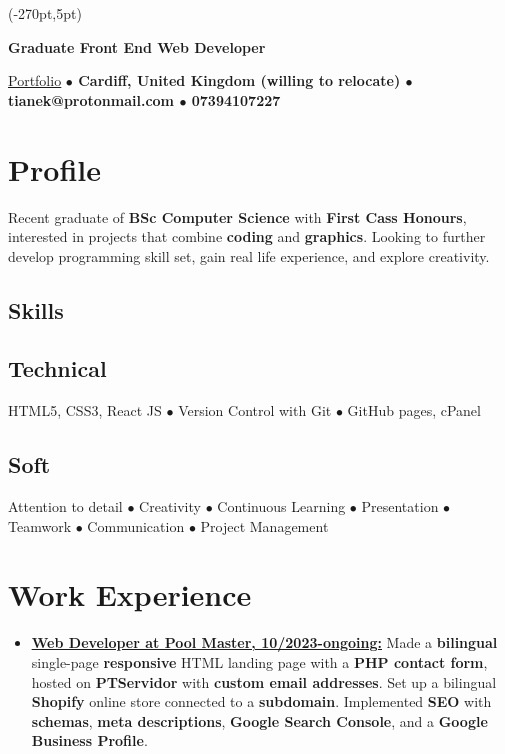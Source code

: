 \documentclass[11pt]{article}
\makeatletter
\newcommand{\verticalline}[1][1pt]{\rule[-0.35ex]{#1}{0.9em}}
\renewcommand{\maketitle}{
\begin{center}
    {\huge\bfseries
    \theauthor \hspace{0.5em}{\verticalline[1.5pt]}\hspace{0.5em}Graduate Front End Web Developer} 

    \vspace{0.7em}

    \ulink{https://orbit-9j.github.io/Portfolio/}{Portfolio} 
    \textbf{$\bullet$  Cardiff, United Kingdom (willing to relocate) $\bullet$ tianek@protonmail.com  $\bullet$ 07394107227}
\end{center}
}
\newcommand{\ulink}[2]{\href{#1}{\uline{#2}}}
\makeatother
\begin{document}
\begin{textblock*}{\paperwidth}(-270pt,5pt)
    \hspace*{\fill}
\end{textblock*}
\vspace*{-0.8cm}
    \author{Rin Tian}
    \maketitle

    \section{Profile}
    Recent graduate of \textbf{BSc Computer Science} with \textbf{First Cass Honours}, interested in projects that combine \textbf{coding} and \textbf{graphics}. Looking to further develop programming skill set, gain real life experience, and explore creativity. 

    \begin{center}
        \section{Skills} 
        \subsection{Technical}
    HTML5, CSS3, React JS $\bullet$ Version Control with Git $\bullet$ GitHub pages, cPanel 
        
        \subsection{Soft}Attention to detail $\bullet$ Creativity $\bullet$ Continuous Learning $\bullet$
        Presentation $\bullet$ Teamwork $\bullet$ Communication $\bullet$ Project Management 
    \end{center}
   
    \section{Work Experience}
    \begin{itemize}[itemsep=3pt, leftmargin=1em]
        \item \ulink{https://poolmaster.pt/} {\textbf{Web Developer at Pool Master, 10/2023-ongoing:}} Made a \textbf{bilingual} single-page \textbf{responsive} HTML landing page with a \textbf{PHP contact form}, hosted on \textbf{PTServidor} with \textbf{custom email addresses}. Set up a bilingual \textbf{Shopify} online store connected to a \textbf{subdomain}. Implemented \textbf{SEO} with \textbf{schemas}, \textbf{meta descriptions}, \textbf{Google Search Console}, and a \textbf{Google Business Profile}.
    \end{itemize}
\end{document}
